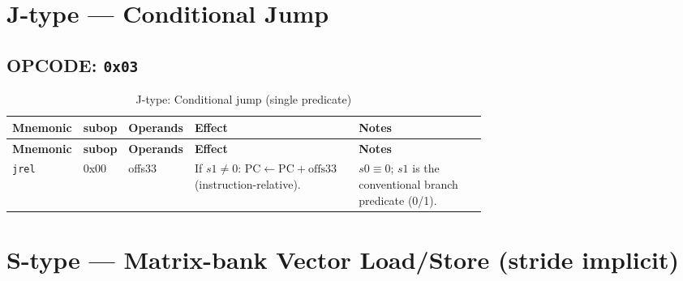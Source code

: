 \documentclass[10pt]{article}
\begin{document}
\section*{J-type — Conditional Jump}
\subsection*{OPCODE: \texttt{0x03}}
\begin{longtable}{@{}l l l L{0.38\linewidth} L{0.30\linewidth}@{}}
\caption{J-type: Conditional jump (single predicate)}\label{tab:jtype}\\
\toprule
\textbf{Mnemonic} & \textbf{subop} & \textbf{Operands} & \textbf{Effect} & \textbf{Notes} \\
\midrule
\endfirsthead
\toprule
\textbf{Mnemonic} & \textbf{subop} & \textbf{Operands} & \textbf{Effect} & \textbf{Notes} \\
\midrule
\endhead
\texttt{jrel} & 0x00 & offs33 &
If $s1 \neq 0$: $\mathrm{PC} \leftarrow \mathrm{PC} + \text{offs33}$ (instruction-relative). &
$s0 \equiv 0$; $s1$ is the conventional branch predicate (0/1). \\
\bottomrule
\end{longtable}

\section*{S-type — Matrix-bank Vector Load/Store (stride implicit)}
\end{document}
